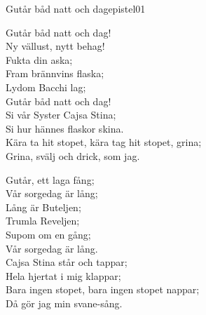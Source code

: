\begin{song}{Gutår båd natt och dag}{epistel01}
\begin{vers}
Gutår båd natt och dag!\\
Ny vällust, nytt behag!\\
Fukta din aska;\\
Fram brännvins flaska;\\
Lydom Bacchi lag;\\
Gutår båd natt och dag!\\
Si vår Syster Cajsa Stina;\\
Si hur hännes flaskor skina.\\
Kära ta hit stopet, kära tag hit stopet, grina;\\
Grina, svälj och drick, som jag.\\
\end{vers}
\begin{vers}
Gutår, ett laga fång;\\
Vår sorgedag är lång;\\
Lång är Buteljen;\\
Trumla Reveljen;\\
Supom om en gång;\\
Vår sorgedag är lång.\\
Cajsa Stina står och tappar;\\
Hela hjertat i mig klappar;\\
Bara ingen stopet, bara ingen stopet nappar;\\
Då gör jag min svane-sång.\\
\end{vers}
\end{song}

